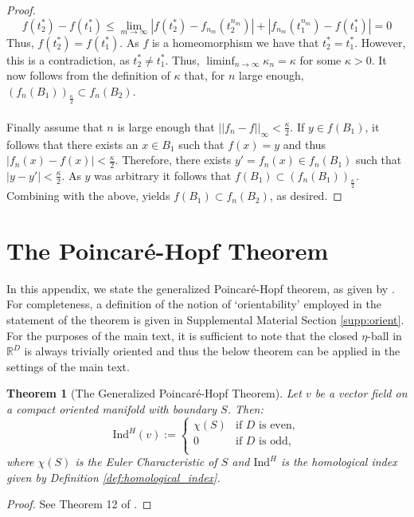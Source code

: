\documentclass[11pt]{article}
\newcommand{\1}{\mathbf{1}}
\newtheorem{thm}{Theorem}%
\theoremstyle{definition}
\theoremstyle{remark}
\begin{document}
\begin{proof}
    \begin{equation}\nonumber
        f(t_2^*)-f(t_1^*)  \leq \lim_{m\rightarrow \infty}|f(t_2^*)-f_{n_m}(t_2^{n_m})|+|f_{n_m}(t_1^{n_m})-f(t_1^*)|=0
    \end{equation}
    Thus, $f(t_2^*)=f(t_1^*)$. As $f$ is a homeomorphism we have that $t_2^*=t_1^*$. However, this is a contradiction, as $t_2^*\neq t_1^*$. Thus, $\liminf_{n\rightarrow\infty}\kappa_n = \kappa$ for some $\kappa>0$. It now follows from the definition of $\kappa$ that, for $n$ large enough, $(f_n(B_1))_{\frac{\kappa}{2}}\subset f_n(B_2)$.\\
    \\
    Finally assume that $n$ is large enough that $||f_n-f||_\infty<\frac{\kappa}{2}$. If $y\in f(B_1)$, it follows that there exists an $x\in B_1$ such that $f(x)=y$ and thus $|f_n(x)-f(x)|<\frac{\kappa}{2}$. Therefore, there exists $y'=f_n(x)\in f_n(B_1)$ such that $|y-y'|<\frac{\kappa}{2}$. As $y$ was arbitrary it follows that $f(B_1) \subset (f_n(B_1))_{\frac{\kappa}{2}}$. Combining with the above, yields  $f(B_1) \subset f_n(B_2)$, as desired.
\end{proof}

\section{The Poincar\'{e}-Hopf Theorem}\label{app:ph}

In this appendix, we state the generalized Poincar\'{e}-Hopf theorem, as given by \cite{jubin2009generalized}. For completeness, a definition of the notion of `orientability' employed in the statement of the theorem is given in Supplemental Material Section \ref{supp:orient}. For the purposes of the main text, it is sufficient to note that the closed $\eta$-ball in $\mathbb{R}^D$ is always trivially oriented and thus the below theorem can be applied in the settings of the main text.

\begin{mdframed}
    \begin{thm}[The Generalized Poincar\'{e}-Hopf Theorem]\label{thm:poincarehopf} Let $v$ be a vector field on a compact oriented manifold with boundary $S$. Then:
    \begin{equation}\nonumber
        \text{Ind}^H(v) := \begin{cases}
            \chi(S) & \text{if }D \text{ is even},\\
            0 & \text{if }D \text{ is odd,}\\
        \end{cases}
    \end{equation}
    where $\chi(S)$ is the Euler Characteristic of $S$ and $\text{Ind}^H$ is the homological index given by Definition \ref{def:homological_index}.
    \end{thm}
    \vspace{0.2cm}
\end{mdframed}
\begin{proof}
    See Theorem 12 of \cite{jubin2009generalized}.
\end{proof}
\end{document}
